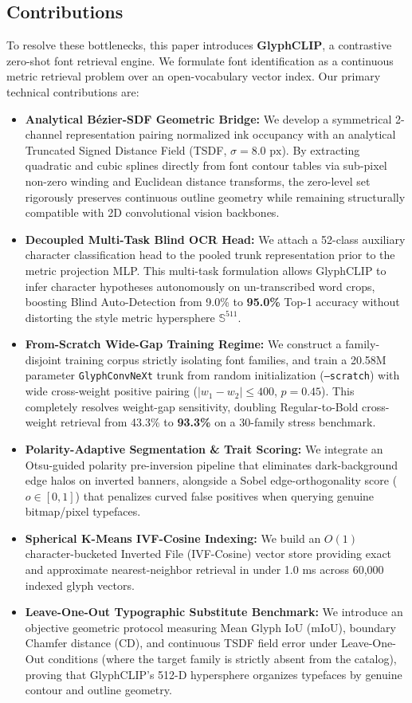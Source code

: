 \documentclass[10pt,twocolumn,letterpaper]{article}
\begin{document}
\subsection{Contributions}
To resolve these bottlenecks, this paper introduces \textbf{GlyphCLIP}, a contrastive zero-shot font retrieval engine. We formulate font identification as a continuous metric retrieval problem over an open-vocabulary vector index. Our primary technical contributions are:
\begin{itemize}
    \item \textbf{Analytical B\'ezier-SDF Geometric Bridge:} We develop a symmetrical 2-channel representation pairing normalized ink occupancy with an analytical Truncated Signed Distance Field (TSDF, $\sigma=8.0\text{ px}$). By extracting quadratic and cubic splines directly from font contour tables via sub-pixel non-zero winding and Euclidean distance transforms, the zero-level set rigorously preserves continuous outline geometry while remaining structurally compatible with 2D convolutional vision backbones.
    \item \textbf{Decoupled Multi-Task Blind OCR Head:} We attach a 52-class auxiliary character classification head to the pooled trunk representation prior to the metric projection MLP. This multi-task formulation allows GlyphCLIP to infer character hypotheses autonomously on un-transcribed word crops, boosting Blind Auto-Detection from 9.0\% to \textbf{95.0\%} Top-1 accuracy without distorting the style metric hypersphere $\mathbb{S}^{511}$.
    \item \textbf{From-Scratch Wide-Gap Training Regime:} We construct a family-disjoint training corpus strictly isolating font families, and train a 20.58M parameter \texttt{GlyphConvNeXt} trunk from random initialization (\texttt{--scratch}) with wide cross-weight positive pairing ($|w_1 - w_2| \le 400$, $p=0.45$). This completely resolves weight-gap sensitivity, doubling Regular-to-Bold cross-weight retrieval from 43.3\% to \textbf{93.3\%} on a 30-family stress benchmark.
    \item \textbf{Polarity-Adaptive Segmentation \& Trait Scoring:} We integrate an Otsu-guided polarity pre-inversion pipeline that eliminates dark-background edge halos on inverted banners, alongside a Sobel edge-orthogonality score ($o \in [0, 1]$) that penalizes curved false positives when querying genuine bitmap/pixel typefaces.
    \item \textbf{Spherical K-Means IVF-Cosine Indexing:} We build an $O(1)$ character-bucketed Inverted File (IVF-Cosine) vector store providing exact and approximate nearest-neighbor retrieval in under 1.0 ms across 60,000 indexed glyph vectors.
    \item \textbf{Leave-One-Out Typographic Substitute Benchmark:} We introduce an objective geometric protocol measuring Mean Glyph IoU ($\text{mIoU}$), boundary Chamfer distance ($\text{CD}$), and continuous TSDF field error under Leave-One-Out conditions (where the target family is strictly absent from the catalog), proving that GlyphCLIP's 512-D hypersphere organizes typefaces by genuine contour and outline geometry.
\end{itemize}
\end{document}
